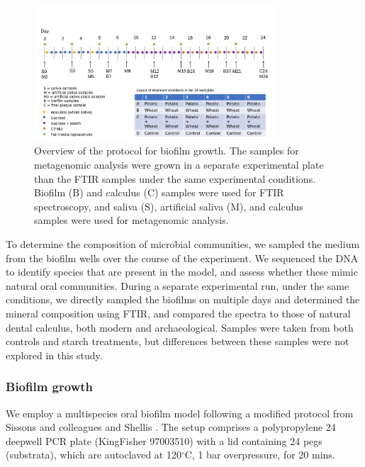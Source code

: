 \documentclass[10pt,a4paper]{article}
\begin{document}
\begin{figure}
    \centering
    \includegraphics[width=0.8\textwidth]{figures/Exp_protocol.png}
    \caption{\label{fig-met-protocol}Overview of the protocol for biofilm
growth. The samples for metagenomic analysis were grown in a separate
experimental plate than the FTIR samples under the same experimental
conditions. Biofilm (B) and calculus (C) samples were used for FTIR
spectroscopy, and saliva (S), artificial saliva (M), and calculus
samples were used for metagenomic analysis.}
\end{figure}

To determine the composition of microbial communities, we sampled the
medium from the biofilm wells over the course of the experiment. We
sequenced the DNA to identify species that are present in the model, and
assess whether these mimic natural oral communities. During a separate
experimental run, under the same conditions, we directly sampled the
biofilms on multiple days and determined the mineral composition using
FTIR, and compared the spectra to those of natural dental calculus, both
modern and archaeological. Samples were taken from both controls and
starch treatments, but differences between these samples were not
explored in this study.

\subsubsection*{Biofilm growth}\label{biofilm-growth}

We employ a multispecies oral biofilm model following a modified
protocol from Sissons and colleagues
\citep{sissonsMultistationPlaque1991} and Shellis
\citep{shellisSyntheticSaliva1978}. The setup comprises a
polypropylene 24 deepwell PCR plate (KingFisher 97003510) with a lid
containing 24 pegs (substrata), which are autoclaved at
120\(^{\circ}\)C, 1 bar overpressure, for 20 mins.
\end{document}
